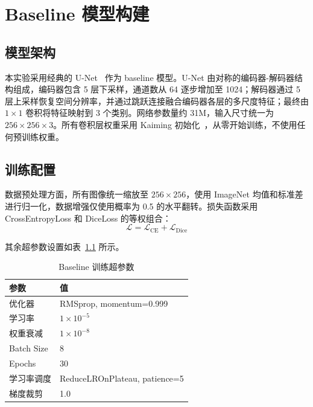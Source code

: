 \chapter{Baseline 模型构建}
\label{chap:baseline}

\section{模型架构}

本实验采用经典的 U-Net~\cite{ronneberger2015unet} 作为 baseline 模型。U-Net 由对称的编码器-解码器结构组成，编码器包含 5 层下采样，通道数从 64 逐步增加至 1024；解码器通过 5 层上采样恢复空间分辨率，并通过跳跃连接融合编码器各层的多尺度特征；最终由 $1 \times 1$ 卷积将特征映射到 3 个类别。网络参数量约 31M，输入尺寸统一为 $256 \times 256 \times 3$。所有卷积层权重采用 Kaiming 初始化~\cite{he2015delving}，从零开始训练，不使用任何预训练权重。

\section{训练配置}

数据预处理方面，所有图像统一缩放至 $256 \times 256$，使用 ImageNet 均值和标准差进行归一化，数据增强仅使用概率为 0.5 的水平翻转。损失函数采用 CrossEntropyLoss 和 DiceLoss 的等权组合：
\begin{equation}
    \mathcal{L} = \mathcal{L}_{\text{CE}} + \mathcal{L}_{\text{Dice}}
\end{equation}

其余超参数设置如表~\ref{tab:baseline_hyperparams} 所示。

\begin{table}[H]
    \centering
    \caption{Baseline 训练超参数}
    \label{tab:baseline_hyperparams}
    \begin{tabularx}{\textwidth}{Xl}
        \hline
        \textbf{参数} & \textbf{值} \\
        \hline
        优化器 & RMSprop, momentum=0.999 \\
        学习率 & $1 \times 10^{-5}$ \\
        权重衰减 & $1 \times 10^{-8}$ \\
        Batch Size & 8 \\
        Epochs & 30 \\
        学习率调度 & ReduceLROnPlateau, patience=5 \\
        梯度裁剪 & 1.0 \\
        \hline
    \end{tabularx}
\end{table}

